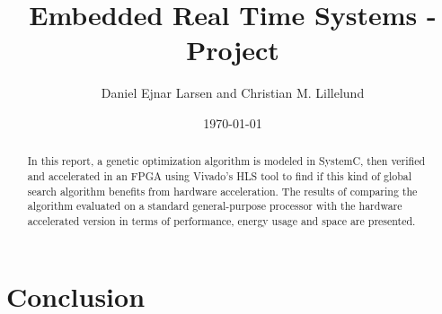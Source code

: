 \documentclass{article}
\title{Embedded Real Time Systems - Project}
\author{Daniel Ejnar Larsen and Christian M. Lillelund}
\date{\today}
\begin{document}
\maketitle
\begin{abstract}
	In this report, a genetic optimization algorithm is modeled in SystemC, then verified and accelerated in an FPGA using Vivado's HLS tool to find if this kind of global search algorithm benefits from hardware acceleration. The results of comparing the algorithm evaluated on a standard general-purpose processor with the hardware accelerated version in terms of performance, energy usage and space are presented.
\end{abstract}


















\section{Conclusion}



\appendix


\end{document}

